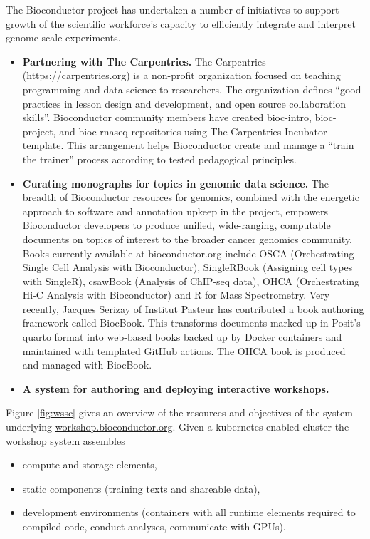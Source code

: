 \documentclass[graybox]{svmult}
\providecommand{\tightlist}{%
  \setlength{\itemsep}{0pt}\setlength{\parskip}{0pt}}
\begin{document}
The Bioconductor project has undertaken a number
of initiatives to support growth of the
scientific workforce's capacity to efficiently
integrate and interpret
genome-scale experiments.

\begin{itemize}
\item
  \textbf{Partnering with The Carpentries.} The Carpentries (https://carpentries.org) is a non-profit organization focused on teaching programming
  and data science to researchers. The organization defines ``good
  practices in lesson design and development, and open source
  collaboration skills''. Bioconductor community members have
  created bioc-intro, bioc-project, and bioc-rnaseq repositories
  using The Carpentries Incubator template. This arrangement helps
  Bioconductor create and manage a ``train the trainer'' process
  according to tested pedagogical principles.
\item
  \textbf{Curating monographs for topics in genomic data science.} The
  breadth of Bioconductor resources for genomics, combined with the
  energetic approach to software and annotation upkeep in the project,
  empowers Bioconductor developers to produce unified, wide-ranging,
  computable documents on topics of interest to the broader
  cancer genomics community. Books currently available
  at bioconductor.org include OSCA (Orchestrating Single Cell Analysis
  with Bioconductor), SingleRBook (Assigning cell types with SingleR),
  csawBook (Analysis of ChIP-seq data), OHCA (Orchestrating Hi-C
  Analysis with Bioconductor) and R for Mass Spectrometry. Very
  recently, Jacques Serizay of Institut Pasteur has contributed
  a book authoring framework called BiocBook. This transforms documents
  marked up in Posit's quarto format into web-based books backed up by Docker
  containers and maintained with templated GitHub actions. The
  OHCA book is produced and managed with BiocBook.
\item
  \textbf{A system for authoring and deploying interactive workshops.}
\end{itemize}

Figure \ref{fig:wssc} gives an overview of the resources and
objectives of the system underlying \url{workshop.bioconductor.org}.
Given a kubernetes-enabled cluster
the workshop system assembles

\begin{itemize}
\tightlist
\item
  compute and storage elements,
\item
  static components (training texts and shareable data),
\item
  development environments (containers with all runtime elements
  required to compiled code, conduct analyses, communicate with GPUs).
\end{itemize}
\end{document}
